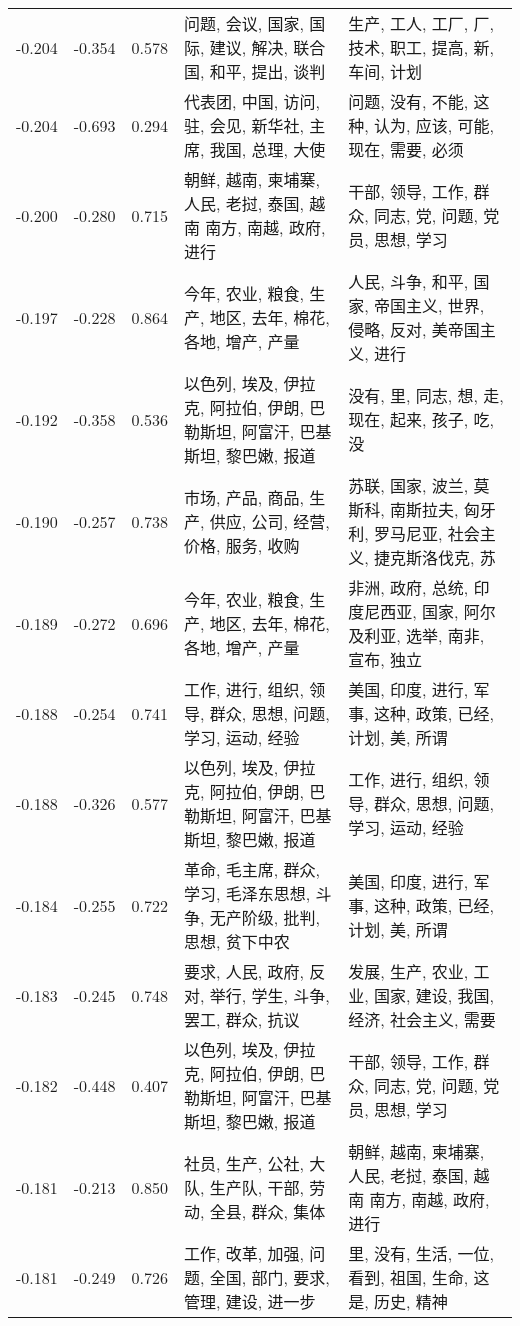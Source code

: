 \begin{tabular}{cccp{5cm}p{5cm}}
-0.204 & -0.354 & 0.578 & 问题, 会议, 国家, 国际, 建议, 解决, 联合国, 和平, 提出, 谈判 & 生产, 工人, 工厂, 厂, 技术, 职工, 提高, 新, 车间, 计划 \\
-0.204 & -0.693 & 0.294 & 代表团, 中国, 访问, 驻, 会见, 新华社, 主席, 我国, 总理, 大使 & 问题, 没有, 不能, 这种, 认为, 应该, 可能, 现在, 需要, 必须 \\
-0.200 & -0.280 & 0.715 & 朝鲜, 越南, 柬埔寨, 人民, 老挝, 泰国, 越南 南方, 南越, 政府, 进行 & 干部, 领导, 工作, 群众, 同志, 党, 问题, 党员, 思想, 学习 \\
-0.197 & -0.228 & 0.864 & 今年, 农业, 粮食, 生产, 地区, 去年, 棉花, 各地, 增产, 产量 & 人民, 斗争, 和平, 国家, 帝国主义, 世界, 侵略, 反对, 美帝国主义, 进行 \\
-0.192 & -0.358 & 0.536 & 以色列, 埃及, 伊拉克, 阿拉伯, 伊朗, 巴勒斯坦, 阿富汗, 巴基斯坦, 黎巴嫩, 报道 & 没有, 里, 同志, 想, 走, 现在, 起来, 孩子, 吃, 没 \\
-0.190 & -0.257 & 0.738 & 市场, 产品, 商品, 生产, 供应, 公司, 经营, 价格, 服务, 收购 & 苏联, 国家, 波兰, 莫斯科, 南斯拉夫, 匈牙利, 罗马尼亚, 社会主义, 捷克斯洛伐克, 苏 \\
-0.189 & -0.272 & 0.696 & 今年, 农业, 粮食, 生产, 地区, 去年, 棉花, 各地, 增产, 产量 & 非洲, 政府, 总统, 印度尼西亚, 国家, 阿尔及利亚, 选举, 南非, 宣布, 独立 \\
-0.188 & -0.254 & 0.741 & 工作, 进行, 组织, 领导, 群众, 思想, 问题, 学习, 运动, 经验 & 美国, 印度, 进行, 军事, 这种, 政策, 已经, 计划, 美, 所谓 \\
-0.188 & -0.326 & 0.577 & 以色列, 埃及, 伊拉克, 阿拉伯, 伊朗, 巴勒斯坦, 阿富汗, 巴基斯坦, 黎巴嫩, 报道 & 工作, 进行, 组织, 领导, 群众, 思想, 问题, 学习, 运动, 经验 \\
-0.184 & -0.255 & 0.722 & 革命, 毛主席, 群众, 学习, 毛泽东思想, 斗争, 无产阶级, 批判, 思想, 贫下中农 & 美国, 印度, 进行, 军事, 这种, 政策, 已经, 计划, 美, 所谓 \\
-0.183 & -0.245 & 0.748 & 要求, 人民, 政府, 反对, 举行, 学生, 斗争, 罢工, 群众, 抗议 & 发展, 生产, 农业, 工业, 国家, 建设, 我国, 经济, 社会主义, 需要 \\
-0.182 & -0.448 & 0.407 & 以色列, 埃及, 伊拉克, 阿拉伯, 伊朗, 巴勒斯坦, 阿富汗, 巴基斯坦, 黎巴嫩, 报道 & 干部, 领导, 工作, 群众, 同志, 党, 问题, 党员, 思想, 学习 \\
-0.181 & -0.213 & 0.850 & 社员, 生产, 公社, 大队, 生产队, 干部, 劳动, 全县, 群众, 集体 & 朝鲜, 越南, 柬埔寨, 人民, 老挝, 泰国, 越南 南方, 南越, 政府, 进行 \\
-0.181 & -0.249 & 0.726 & 工作, 改革, 加强, 问题, 全国, 部门, 要求, 管理, 建设, 进一步 & 里, 没有, 生活, 一位, 看到, 祖国, 生命, 这是, 历史, 精神 \\

\end{tabular}
